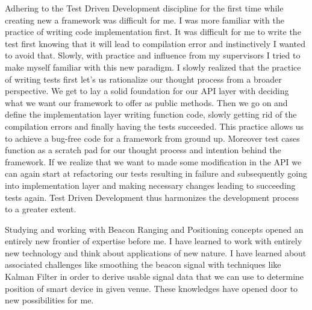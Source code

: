 \par Adhering to the Test Driven Development discipline for the first time while creating new a framework was difficult for me. I was more familiar with the practice of  writing code implementation first. It was difficult for me to write the test first knowing that it will lead to compilation error and instinctively I wanted to avoid that. Slowly, with practice and influence from my supervisors I tried to make myself familiar with this new paradigm. I slowly realized that the practice of writing tests first let's us rationalize our thought process from a broader perspective. We get to lay a solid foundation for our API layer with deciding what we want our framework to offer as public methods. Then we go on and define the implementation layer writing function code, slowly getting rid of the compilation errors and finally having the tests succeeded. This practice allows us to achieve a bug-free code for a framework from ground up. Moreover test cases function as a scratch pad for our thought process and intention behind the framework. If we realize that we want to made some modification in the API we can again start at refactoring our tests resulting in failure and subsequently going into implementation layer and making necessary changes leading to succeeding tests again. Test Driven Development thus harmonizes the development process to a greater extent.

\par Studying and working with Beacon Ranging and Positioning concepts opened an entirely new frontier of expertise before me. I have learned to work with entirely new technology and think about applications of new nature. I have learned about associated challenges like smoothing the beacon signal with techniques like Kalman Filter in order to derive usable signal data that we can use to determine position of smart device in given venue. These knowledges have opened door to new possibilities for me.